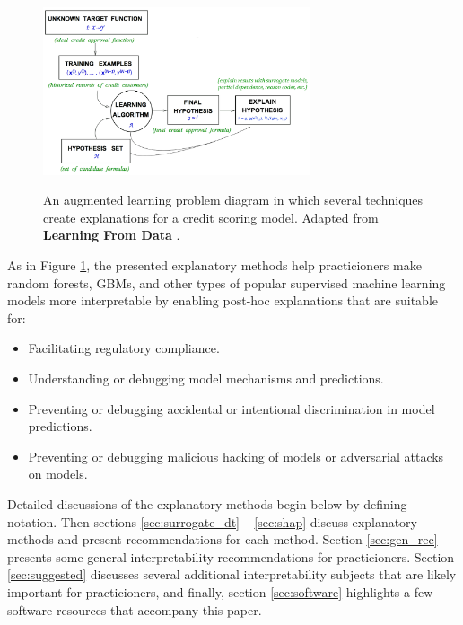 \documentclass{article}
\begin{document}
\begin{figure}[htb]
	\begin{center}
		\includegraphics[height=140pt]{img/learning_problem.png}
		\label{fig:learning_problem}
		\caption{An augmented learning problem diagram in which several techniques create explanations for a credit scoring model. Adapted from \textbf{Learning From Data} \cite{lfd}.}
	\end{center}
\end{figure}	
	
As in Figure \ref{fig:learning_problem}, the presented explanatory methods help practicioners make random forests, GBMs, and other types of popular supervised  machine learning models more interpretable by enabling post-hoc explanations that are suitable for:\\

\begin{itemize}
	\item Facilitating regulatory compliance.
	\item Understanding or debugging model mechanisms and predictions.
	\item Preventing or debugging accidental or intentional discrimination in model predictions.
	\item Preventing or debugging malicious hacking of models or adversarial attacks on models.
\end{itemize}

Detailed discussions of the explanatory methods begin below by defining notation. Then sections \ref{sec:surrogate_dt} -- \ref{sec:shap} discuss explanatory methods and present recommendations for each method. Section \ref{sec:gen_rec} presents some general interpretability recommendations for practicioners. Section \ref{sec:suggested} discusses several additional interpretability subjects that are likely important for practicioners, and finally, section \ref{sec:software} highlights a few software resources that accompany this paper. 

\end{document}
